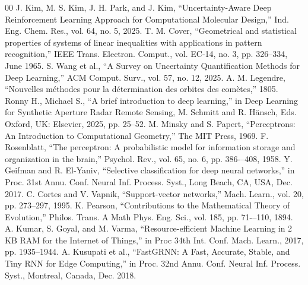 \documentclass[conference]{IEEEtran}
\begin{document}
\begin{thebibliography}{00}
 J. Kim, M. S. Kim, J. H. Park, and J. Kim, ``Uncertainty-Aware Deep Reinforcement Learning Approach for Computational Molecular Design,'' Ind. Eng. Chem. Res., vol. 64, no. 5, 2025.
 T. M. Cover, ``Geometrical and statistical properties of systems of linear inequalities with applications in pattern recognition,'' IEEE Trans. Electron. Comput., vol. EC-14, no. 3, pp. 326--334, June 1965.
 S. Wang et al., ``A Survey on Uncertainty Quantification Methods for Deep Learning,'' ACM Comput. Surv., vol. 57, no. 12, 2025.
 A. M. Legendre, ``Nouvelles méthodes pour la détermination des orbites des comètes,'' 1805.
 Ronny H., Michael S., ``A brief introduction to deep learning,'' in Deep Learning for Synthetic Aperture Radar Remote Sensing, M. Schmitt and R. Hänsch, Eds. Oxford, UK: Elsevier, 2025, pp. 25–52.
 M. Minsky and S. Papert, ``Perceptrons: An Introduction to Computational Geometry,'' The MIT Press, 1969.
 F. Rosenblatt, ``The perceptron: A probabilistic model for information storage and organization in the brain,'' Psychol. Rev., vol. 65, no. 6, pp. 386-–408, 1958.
 Y. Geifman and R. El-Yaniv, ``Selective classification for deep neural networks,'' in Proc. 31st Annu. Conf. Neural Inf. Process. Syst., Long Beach, CA, USA, Dec. 2017.
 C. Cortes and V. Vapnik, ``Support-vector networks,'' Mach. Learn., vol. 20, pp. 273--297, 1995.
 K. Pearson, ``Contributions to the Mathematical Theory of Evolution,'' Philos. Trans. A Math Phys. Eng. Sci., vol. 185, pp. 71-–110, 1894.
 A. Kumar, S. Goyal, and M. Varma, ``Resource-efficient Machine Learning in 2 KB RAM for the Internet of Things,'' in Proc 34th Int. Conf. Mach. Learn., 2017, pp. 1935--1944.
 A. Kusupati et al., ``FastGRNN: A Fast, Accurate, Stable, and Tiny RNN for Edge Computing,'' in Proc. 32nd Annu. Conf. Neural Inf. Process. Syst., Montreal, Canada, Dec. 2018.
\end{thebibliography}
\end{document}
